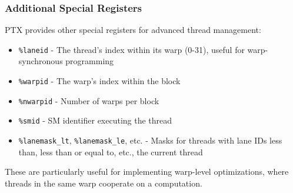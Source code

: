 \subsubsection{Additional Special Registers}

PTX provides other special registers for advanced thread management:

\begin{itemize}
    \item \texttt{\%laneid} - The thread's index within its warp (0-31), useful for warp-synchronous programming
    
    \item \texttt{\%warpid} - The warp's index within the block
    
    \item \texttt{\%nwarpid} - Number of warps per block
    
    \item \texttt{\%smid} - SM identifier executing the thread
    
    \item \texttt{\%lanemask\_lt}, \texttt{\%lanemask\_le}, etc. - Masks for threads with lane IDs less than, less than or equal to, etc., the current thread
\end{itemize}

These are particularly useful for implementing warp-level optimizations, where threads in the same warp cooperate on a computation.

